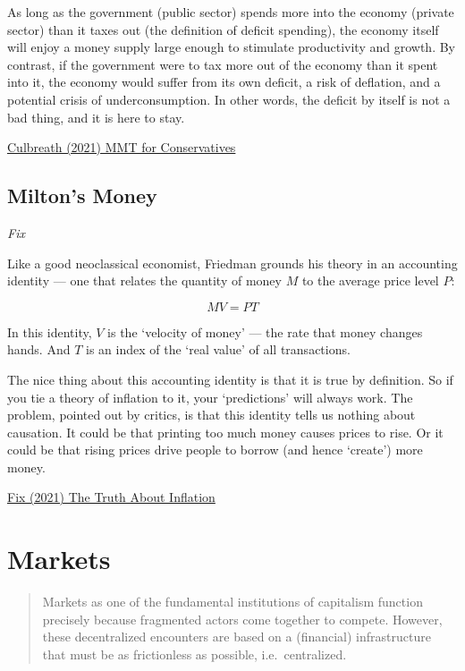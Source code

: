 \documentclass[
]{book}
\begin{document}
As long as the government (public sector) spends more into the economy (private sector) than it taxes out (the definition of deficit spending), the economy itself will enjoy a money supply large enough to stimulate productivity and growth. By contrast, if the government were to tax more out of the economy than it spent into it, the economy would suffer from its own deficit, a risk of deflation, and a potential crisis of underconsumption. In other words, the deficit by itself is not a bad thing, and it is here to stay.

\href{https://www.theamericanconservative.com/articles/modern-monetary-theory-for-conservatives/}{Culbreath (2021) MMT for Conservatives}

\hypertarget{miltons-money}{%
\section{Milton's Money}\label{miltons-money}}

\emph{Fix}

Like a good neoclassical economist, Friedman grounds his theory in an accounting identity --- one that relates the quantity of money \(M\) to the average price level \(P\):

\[MV=PT\]

In this identity, \(V\) is the `velocity of money' --- the rate that money changes hands. And \(T\) is an index of the `real value' of all transactions.

The nice thing about this accounting identity is that it is true by definition. So if you tie a theory of inflation to it, your `predictions' will always work. The problem, pointed out by critics, is that this identity tells us nothing about causation. It could be that printing too much money causes prices to rise. Or it could be that rising prices drive people to borrow (and hence `create') more money.

\href{https://economicsfromthetopdown.com/2021/11/24/the-truth-about-inflation/}{Fix (2021) The Truth About Inflation}

\hypertarget{markets}{%
\chapter{Markets}\label{markets}}

\begin{quote}
Markets as one of the fundamental institutions of capitalism function precisely because fragmented actors come together to compete. However, these decentralized encounters are based on a (financial) infrastructure that must be as frictionless as possible, i.e.~centralized.
\end{quote}
\end{document}
